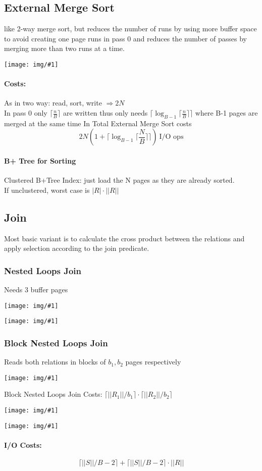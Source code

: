 \documentclass[a4paper]{article}
\newcommand{\img}[1]{\begin{center}
    \texttt{[image: img/\#1]}
\end{center} }
\begin{document}
\begin{twocolumn}
\subsection{External Merge Sort}
like 2-way merge sort, but reduces the number of runs by using more buffer space to avoid creating one page runs in pass 0 and reduces the number of passes by merging more than two runs at a time.
\img{external_ms.png}

\paragraph{Costs:} As in two way: read, sort, write $\Rightarrow 2N$ \\
In pass 0 only $\lceil \frac{n}{B}\rceil$ are written thus only needs $\lceil \log_{B-1} \lceil \frac{n}{B}\rceil\rceil$ where B-1 pages are merged at the same time
In Total External Merge Sort costs \[ 2 N (1+ \lceil \log_{B-1} \lceil \frac{N}{B}\rceil\rceil) \ \text{I/O ops}\]

\paragraph{B+ Tree for Sorting}
Clustered B+Tree Index: just load the N pages as they are already sorted. \\
If unclustered, worst case is $|R| \cdot ||R||$

\subsection{Join}
Most basic variant is to calculate the cross product between the relations and apply selection according to the join predicate.

\subsubsection{Nested Loops Join}
Needs 3 buffer pages \\
\img{nlj_algo}
\img{nlj_costs}


\subsubsection{Block Nested Loops Join}
 Reads both relations in blocks of $b_1, b_2$ pages respectively
\img{bnlj_basic}
Block Nested Loops Join Costs: $\lceil ||R_1||/b_1 \rceil \cdot \lceil ||R_2||/b_2 \rceil$
\img{bnlj_hash_g}
\img{bnlj_hash}

\paragraph{I/O Costs:} \[ \lceil ||S|| / B-2 \rceil + \lceil ||S|| / B-2 \rceil \cdot ||R||  \]


\end{twocolumn}
\end{document}
